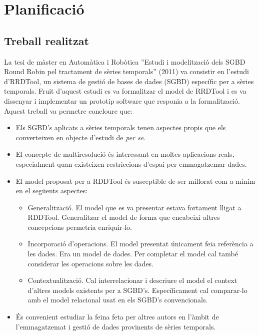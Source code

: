 \chapter{Planificació}

\section{Treball realitzat}


La tesi de màster en Automàtica i Robòtica ''Estudi i modelització
dels SGBD Round Robin pel tractament de sèries temporals'' (2011) va
consistir en l'estudi d'RRDTool, un sistema de gestió de bases de
dades (SGBD) específic per a sèries temporals.
%
Fruit d'aquest estudi es va formalitzar el model de RRDTool i es va
dissenyar i implementar un prototip software que responia a la
formalització.
%
Aquest treball va permetre concloure que:
\begin{itemize}
\item Els SGBD's aplicats a sèries temporals tenen aspectes propis que
  els converteixen en objecte d'estudi de \emph{per se}.
\item El concepte de multiresolució és interessant en moltes
  aplicacions reals, especialment quan existeixen restriccions d'espai
  per emmagatzemar dades.
\item El model proposat per a RDDTool és susceptible de ser millorat
  com a mínim en el següents aspectes:
  \begin{itemize}
  \item Generalització. El model que es va presentar estava fortament
    lligat a RDDTool. Generalitzar el model de forma que encabeixi
    altres concepcions permetria enriquir-lo.
  \item Incorporació d'operacions. El model presentat únicament feia
    referència a les dades. Era un model de dades. Per completar el
    model cal també considerar les operacions sobre les dades.
  \item Contextualització. Cal interrelacionar i descriure el model el
    context d'altres models existents per a SGBD's. Específicament cal
    comparar-lo amb el model relacional usat en els SGBD's
    convencionals.
  \end{itemize}
\item És convenient estudiar la feina feta per altres autors en
  l'àmbit de l'emmagatzemat i gestió de dades provinents de sèries
  temporals.
\end{itemize}

